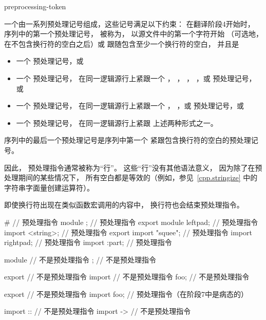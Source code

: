 \begin{bnf}
\br
    preprocessing-token 
\end{bnf}

\begin{bnf}
\br
\end{bnf}

\pnum
一个由一系列预处理记号组成，这些记号满足以下约束：
在翻译阶段4开始时，
序列中的第一个预处理记号，
被称为，
以源文件中的第一个字符开始
（可选地，在不包含换行符的空白之后）或
跟随包含至少一个换行符的空白，
并且是

\begin{itemize}
\item
一个 \tcode{\#} 预处理记号，或

\item
一个  预处理记号，
在同一逻辑源行上紧跟一个
，
\tcode{<}，
，
，或
\tcode{:}
预处理记号，或

\item
一个  预处理记号，
在同一逻辑源行上紧跟一个
，
\tcode{:}，或
\tcode{;}
预处理记号，或

\item
一个  预处理记号，
在同一逻辑源行上紧跟
上述两种形式之一。
\end{itemize}

序列中的最后一个预处理记号是序列中第一个
紧跟包含换行符的空白的预处理记号。
\begin{footnote}
因此，
预处理指令通常被称为“行”。
这些“行”没有其他语法意义，
因为除了在预处理期间的某些情况下，
所有空白都是等效的（例如，参见~\ref{cpp.stringize} 中的
\tcode{\#}
字符串字面量创建运算符）。
\end{footnote}
\begin{note}
即使换行符出现在类似函数宏调用的内容中，
换行符也会结束预处理指令。
\end{note}

\begin{example}
\begin{codeblock}
#                       // 预处理指令
module ;                // 预处理指令
export module leftpad;  // 预处理指令
import <string>;        // 预处理指令
export import "squee";  // 预处理指令
import rightpad;        // 预处理指令
import :part;           // 预处理指令

module                  // 不是预处理指令
;                       // 不是预处理指令

export                  // 不是预处理指令
import                  // 不是预处理指令
foo;                    // 不是预处理指令

export                  // 不是预处理指令
import foo;             // 预处理指令（在阶段7中是病态的）

import ::               // 不是预处理指令
import ->               // 不是预处理指令
\end{codeblock}
\end{example}

